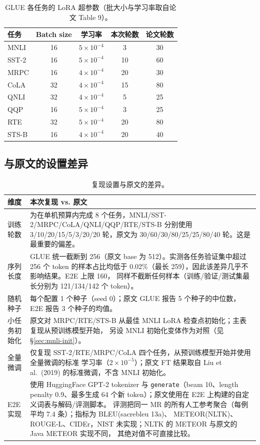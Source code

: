 \documentclass[11pt,a4paper]{ctexart}
\begin{document}
\begin{table}[H]
\centering
\caption{GLUE 各任务的 LoRA 超参数（批大小与学习率取自论文 Table 9）。}
\label{tab:hparams}
\small
\begin{tabular}{l c c c c}
\toprule
任务 & Batch size & 学习率 & 本次轮数 & 论文轮数 \\
\midrule
MNLI  & 16 & $5\times10^{-4}$ & 3  & 30 \\
SST-2 & 16 & $5\times10^{-4}$ & 10 & 60 \\
MRPC  & 16 & $4\times10^{-4}$ & 20 & 30 \\
CoLA  & 32 & $4\times10^{-4}$ & 15 & 80 \\
QNLI  & 32 & $4\times10^{-4}$ & 5  & 25 \\
QQP   & 16 & $5\times10^{-4}$ & 3  & 25 \\
RTE   & 32 & $5\times10^{-4}$ & 20 & 80 \\
STS-B & 16 & $4\times10^{-4}$ & 20 & 40 \\
\bottomrule
\end{tabular}
\end{table}

\subsection{与原文的设置差异}
\label{sec:deviations}
\begin{table}[H]
\centering
\caption{复现设置与原文的差异。}
\label{tab:dev}
\small
\begin{tabularx}{\textwidth}{l X}
\toprule
维度 & 本次复现 vs. 原文 \\
\midrule
训练轮数 & 为在单机预算内完成 8 个任务，MNLI/SST-2/MRPC/CoLA/QNLI/QQP/RTE/STS-B 分别使用
3/10/20/15/5/3/20/20 轮，原文为 30/60/30/80/25/25/80/40 轮。这是最重要的偏差。 \\
序列长度 & GLUE 统一截断到 256（原文 base 为 512）。实测各任务验证集中超过 256 个
token 的样本占比均低于 0.02\%（最长 259），因此该差异几乎不影响结果。E2E 上限 160，
同样不截断任何样本（训练/验证/测试集最长分别为 121/134/142 个 token）。\\
随机种子 & 每个配置 1 个种子（seed 0）；原文 GLUE 报告 5 个种子的中位数，E2E 报告 3 个种子的均值。\\
小任务初始化 & 原文对 MRPC/RTE/STS-B 从最佳 MNLI LoRA 检查点初始化；主表复现从预训练模型开始，
另设 MNLI 初始化变体作为对照（见 \S\ref{sec:mnli-init}）。 \\
全量微调 & 仅复现 SST-2/RTE/MRPC/CoLA 四个任务，从预训练模型开始并使用全量微调的标准
学习率（$2\times10^{-5}$）；原文 FT 结果取自 Liu et al.\ (2019) 的标准微调，不含 MNLI 初始化。\\
E2E 实现 & 使用 HuggingFace GPT-2 tokenizer 与 \texttt{generate}（beam 10、length penalty
0.9、最多生成 64 个新 token）；原文使用在 E2E 上构建的自定义词表与解码/评测脚本。
评测把同一 MR 的所有人工参考聚合（每例平均 7.4 条）；指标为 BLEU(sacrebleu 13a)、
METEOR(NLTK)、ROUGE-L、CIDEr，NIST 未实现；NLTK 的 METEOR 与原文的 Java METEOR 实现不同，
其绝对值不可直接比较。\\
\bottomrule
\end{tabularx}
\end{table}
\end{document}
